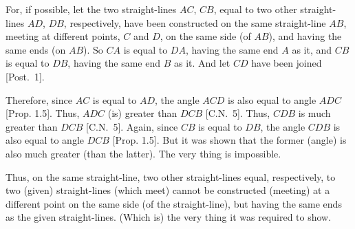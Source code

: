 \begin{Parallel}{}{}
{For, if possible, let the two straight-lines $AC$, $CB$, equal to two other straight-lines $AD$, $DB$, respectively, have been constructed
on the same straight-line $AB$, meeting at different points, $C$ and $D$, on the
same side (of $AB$), and having the same ends (on $AB$). So $CA$ is equal to $DA$, having the same end $A$ as it, and $CB$ is equal to $DB$, having the
same end $B$ as it. And let $CD$ have been joined [Post.~1].

Therefore, since $AC$ is equal to $AD$,  the angle $ACD$ is also equal to angle $ADC$ [Prop. 1.5].
Thus, $ADC$ (is) greater than $DCB$ [C.N.~5]. Thus, $CDB$ is much greater
than $DCB$ [C.N.~5]. Again, since  $CB$ is equal to $DB$, the angle $CDB$ is also equal to
angle $DCB$ [Prop. 1.5]. But it was shown that the former (angle) is also much
greater (than the latter). The very thing is impossible.

Thus, on the same straight-line, two other straight-lines equal, respectively, to  
two (given) straight-lines  (which meet) cannot be constructed (meeting)
at a different point on the same
side (of the straight-line), but having the same ends as the given straight-lines.
(Which is) the very thing it was required to show.}
\end{Parallel}

